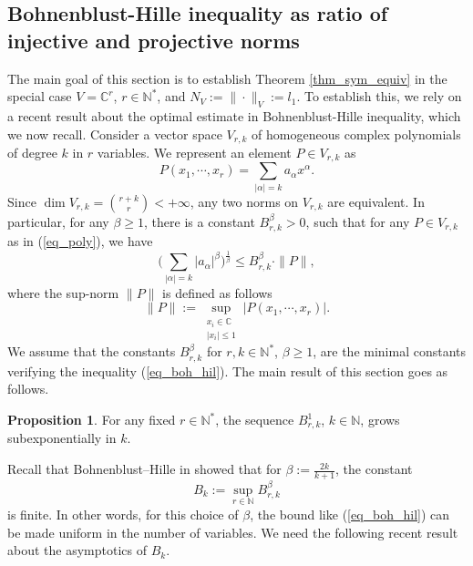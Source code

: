 \documentclass[12pt]{article}
\numberwithin{equation}{section}
\theoremstyle{theorem}
\theoremstyle{definition}
\newtheorem{prop}[thm]{Proposition}
\theoremstyle{remark}
\newcommand{\comp}{\mathbb{C}}
\newcommand{\nat}{\mathbb{N}}
\begin{document}
	\subsection{Bohnenblust-Hille inequality as ratio of injective and projective norms}\label{sect_bohn_hill}
	The main goal of this section is to establish Theorem \ref{thm_sym_equiv} in the special case  $V = \comp^r$, $r \in \nat^*$, and $N_V := \| \cdot \|_V := \textit{l}_1$.
	To establish this, we rely on a recent result about the optimal estimate in Bohnenblust-Hille inequality, which we now recall.
	Consider a vector space $V_{r, k}$ of homogeneous complex polynomials of degree $k$ in $r$ variables.
	We represent an element $P \in V_{r, k}$ as
	\begin{equation}\label{eq_poly}
		P(x_1, \cdots, x_r)
		=
		\sum_{|\alpha| = k} a_{\alpha} x^{\alpha}.
	\end{equation}
	Since $\dim V_{r, k} = \binom{r + k}{r} < +\infty$, any two norms on $V_{r, k}$ are equivalent.
	In particular, for any $\beta \geq 1$, there is a constant $B_{r, k}^{\beta} > 0$, such that for any $P \in V_{r, k}$ as in (\ref{eq_poly}), we have
	\begin{equation}\label{eq_boh_hil}
		\Big( 
			\sum_{|\alpha| = k} |a_{\alpha}|^{\beta}
		\Big)^{\frac{1}{\beta}}
		\leq
		B_{r, k}^{\beta}
		\cdot
		\| P \|,
	\end{equation}
	where the sup-norm $\| P \|$ is defined as follows 
	\begin{equation}
		\| P \| := \sup_{\substack{x_i \in \comp \\ |x_i| \leq 1}} \big| P(x_1, \cdots, x_r) \big|.
	\end{equation}
	We assume that the constants $B_{r, k}^{\beta}$ for $r, k \in \nat^*$, $\beta \geq 1$, are the minimal constants verifying the inequality (\ref{eq_boh_hil}).
	The main result of this section goes as follows.
	\begin{prop}\label{prop_subexp}
		For any fixed $r \in \nat^*$, the sequence $B_{r, k}^{1}$, $k \in \nat$, grows subexponentially in $k$.
	\end{prop}
	Recall that Bohnenblust–Hille in \cite{BohnHill} showed that for $\beta := \frac{2k}{k + 1}$, the constant 
	\begin{equation}
		B_k := \sup_{r \in \nat} B_{r, k}^{\beta}
	\end{equation}	
	is finite.
	In other words, for this choice of $\beta$, the bound like (\ref{eq_boh_hil}) can be made uniform in the number of variables.
	We need the following recent result about the asymptotics of $B_k$.
\end{document}
